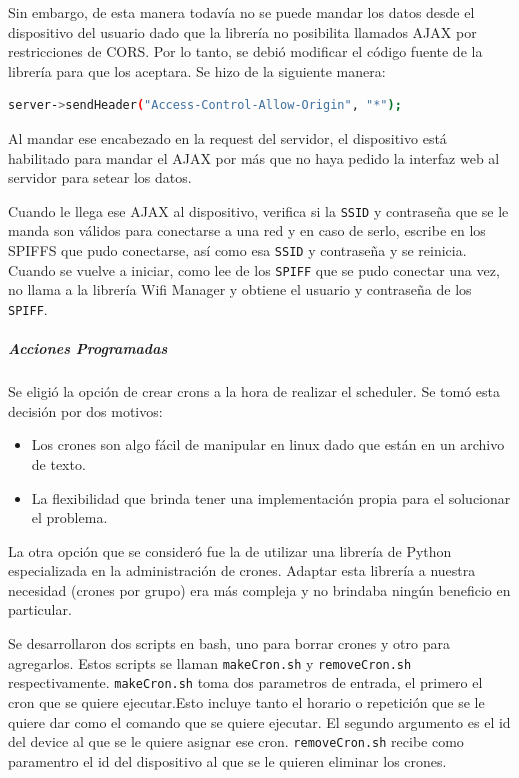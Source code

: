 Sin embargo, de esta manera todavía no se puede mandar los datos desde el dispositivo del usuario dado que la librería no posibilita llamados AJAX por restricciones de CORS. Por lo tanto, se debió modificar el código fuente de la librería para que los aceptara. Se hizo de la siguiente manera:

\begin{lstlisting}[language=bash]
server->sendHeader("Access-Control-Allow-Origin", "*");
\end{lstlisting}


Al mandar ese encabezado en la request del servidor, el dispositivo está habilitado para mandar el AJAX por más que no haya pedido la interfaz web al servidor para setear los datos.

Cuando le llega ese AJAX al dispositivo, verifica si la \lstinline[columns=fixed]{SSID} y contraseña que se le manda son válidos para conectarse a una red y en caso de serlo, escribe en los SPIFFS que pudo conectarse, así como esa  \lstinline[columns=fixed]{SSID} y contraseña y  se reinicia. Cuando se vuelve a iniciar, como lee de los \lstinline[columns=fixed]{SPIFF} que se pudo conectar una vez, no llama a la librería Wifi Manager y obtiene el usuario y contraseña de los \lstinline[columns=fixed]{SPIFF}.



\subparagraph{Acciones Programadas}

Se eligió la opción de crear crons a la hora de realizar el scheduler. Se tomó esta decisión por dos motivos: 
\begin{itemize}
  \item Los crones son algo fácil de manipular en linux dado que están en un archivo de texto.
  \item La flexibilidad que brinda tener una implementación propia para el solucionar el problema.
\end{itemize}

La otra opción que se consideró fue la de utilizar una librería de Python especializada en la administración de crones. Adaptar esta librería a nuestra necesidad (crones por grupo) era más compleja y no brindaba ningún beneficio en particular.

Se desarrollaron dos scripts en bash, uno para borrar crones y otro para agregarlos. Estos scripts se llaman \lstinline[columns=fixed]{makeCron.sh} y \lstinline[columns=fixed]{removeCron.sh} respectivamente.
\lstinline[columns=fixed]{makeCron.sh} toma dos parametros de entrada, el primero el cron que se quiere ejecutar.Esto incluye tanto el horario o repetición que se le quiere dar como el comando que se quiere ejecutar. El segundo argumento es el id del device al que se le quiere asignar ese cron. 
\lstinline[columns=fixed]{removeCron.sh} recibe como paramentro el id del dispositivo al que se le quieren eliminar los crones.

